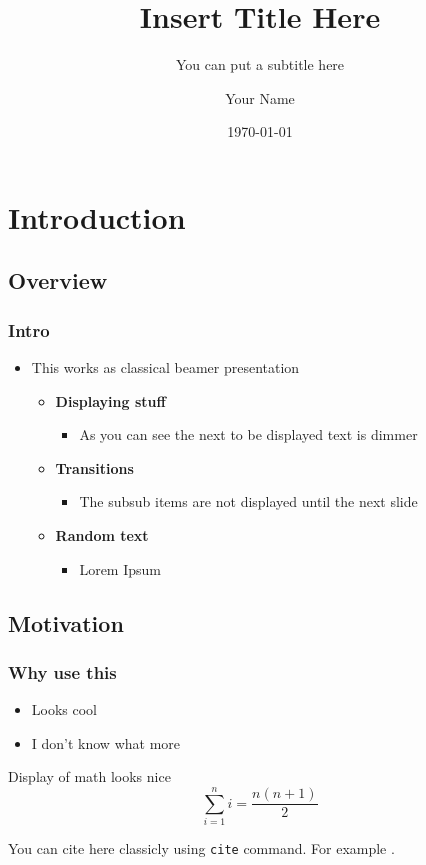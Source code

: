 \documentclass[xcolor={usenames,dvipsnames},aspectratio=169, 12pt]{beamer}
\title{Insert Title Here}
\author{Your Name}
\subtitle{You can put a subtitle here}
\institute{Charles University}
\date[\MONTH~\the\day] %
{\today}
\begin{document}
\titleframe

\section{Introduction}
\subsection{Overview}
\begin{frame}
\frametitle{Intro}
  \begin{itemize}
    \item<1-> This works as classical beamer presentation
    \begin{itemize}
      \item<2-> \textbf{Displaying stuff}
      \begin{itemize}
        \item<2-> As you can see the next to be displayed text is dimmer
      \end{itemize}
      \item<3-> \textbf{Transitions}
      \begin{itemize}
        \item<3-> The subsub items are not displayed until the next slide
      \end{itemize}
      \item<4-> \textbf{Random text}
      \begin{itemize}
        \item<4-> Lorem Ipsum
      \end{itemize}
    \end{itemize}
  \end{itemize}
\end{frame}

\subsection{Motivation}
\begin{frame}
\frametitle{Why use this}
\begin{itemize}
  \item Looks cool
\end{itemize}
\begin{itemize}
  \item I don't know what more
\end{itemize}
\begin{block}{Display of math looks nice}
  \begin{equation}
    \sum_{i=1}^{n} i = \frac{n(n+1)}{2}
  \end{equation}
\end{block}
You can cite here classicly using \texttt{cite} command. For example \cite{lapointe1997average}.
\end{frame}
\end{document}
